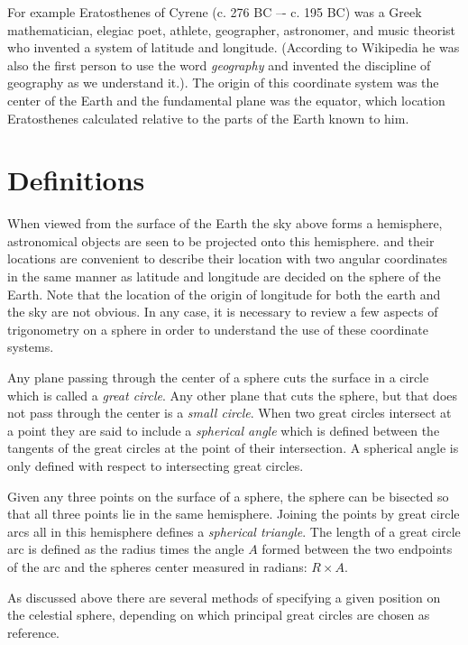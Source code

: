For example Eratosthenes of Cyrene (c. 276 BC –- c. 195 BC) was a Greek mathematician, elegiac poet, athlete, geographer, astronomer, and music theorist who invented a system of latitude
and longitude. (According to Wikipedia he was also the first person to use the word {\it geography} and invented the discipline of geography as we understand it.). The origin of 
this coordinate system was the center of the Earth and the fundamental plane was the 
equator, which location Eratosthenes calculated relative to the parts of the Earth known
to him. 

\section{Definitions}
When viewed from the surface of the Earth the sky above forms a hemisphere, 
astronomical objects are seen to be projected onto this hemisphere. and their 
locations are convenient to describe their location with two angular coordinates in the
same manner as latitude and longitude are decided on the sphere of the Earth. 
Note that the location of the origin of longitude for both the earth and the 
sky are not obvious. In any case, it is necessary to review a few aspects of 
trigonometry on a sphere in order to understand the use of these coordinate 
systems.

Any plane passing through the center of a sphere cuts the surface in a
circle which is called a {\it great circle}. Any other plane that cuts
the sphere, but that does not pass through the center is a {\it small
  circle}. When two great circles intersect at a point they are said
to include a {\it spherical angle} which is defined between the
tangents of the great circles at the point of their intersection. A
spherical angle is only defined with respect to intersecting great
circles.

Given any three points on the surface of a sphere, the sphere can be
bisected so that all three points lie in the same hemisphere. Joining
the points by great circle arcs all in this hemisphere defines a {\it
  spherical triangle}. The length of a great circle arc is defined as
the radius times the angle $A$ formed between the two endpoints of the
arc and the spheres center measured in radians: $R\times A$.

As discussed above there are several methods of specifying a given position on the
celestial sphere, depending on which principal great circles are
chosen as reference. 

